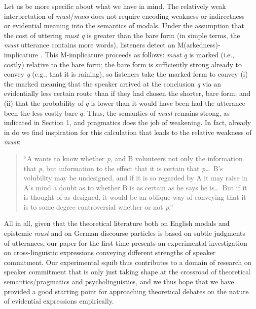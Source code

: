 \documentclass[11pt]{article}
\begin{document}
Let us be more specific about what we have in mind. The relatively weak interpretation of \emph{must}/\emph{muss} does not require encoding weakness or indirectness or evidential meaning into the semantics of modals. Under the assumption that the cost of uttering \emph{must q} is greater than the bare form (in simple terms, the \emph{must} utterance contains more words), listeners detect an M(arkedness)-implicature \citep{levinson2000}. This M-implicature proceeds as follows: \emph{must q} is marked (i.e., costly) relative to the bare form; the bare form is sufficiently strong already to convey \emph{q} (e.g., that it is raining), so listeners take the marked form to convey (i) the marked meaning that the speaker arrived at the conclusion \emph{q} via an evidentially less certain route than if they had chosen the shorter, bare form; and (ii) that the probability of \emph{q} is lower than it would have been had the utterance been the less costly bare $q$. Thus, the semantics of \emph{must} remains strong, as indicated in Section 1, and pragmatics does the job of weakening. In fact, already in \citet[pp.~33--34]{grice1989} do we find inspiration for this calculation that leads to the relative weakness of \emph{must}:

\begin{quotation}
``A wants to know whether \emph{p}, and B volunteers not only the information that \emph{p}, but information to the effect that it is certain that \emph{p}\ldots\ B's volubility may be undesigned, and if it is so regarded by A it may raise in A's mind a doubt as to whether B is as certain as he says he is\ldots\ But if it is thought of as designed, it would be an oblique way of conveying that it is to some degree controversial whether or not \emph{p}.''
\end{quotation}


All in all, given that the theoretical literature both on English modals and epistemic \emph{must} and on German discourse particles is based on subtle judgments of utterances, our paper for the first time presents an experimental investigation on cross-linguistic expressions conveying different strengths of speaker commitment. Our experimental squib thus contributes to a domain of research on speaker commitment that is only just taking shape at the crossroad of theoretical semantics/pragmatics and psycholinguistics, and we thus hope that we have provided a good starting point for approaching theoretical debates on the nature of evidential expressions empirically.
\end{document}
